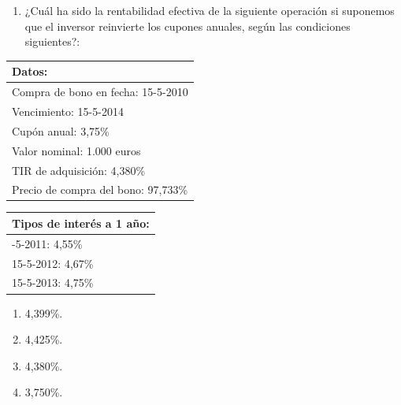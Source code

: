 \documentclass[
  letterpaper,
  DIV=11,
  numbers=noendperiod]{scrreprt}
\providecommand{\tightlist}{%
  \setlength{\itemsep}{0pt}\setlength{\parskip}{0pt}}\usepackage{longtable,booktabs,array}
\begin{document}
\begin{tcolorbox}
\begin{enumerate}
\def\labelenumi{\arabic{enumi}.}
\setcounter{enumi}{9}
\tightlist
\item
  ¿Cuál ha sido la rentabilidad efectiva de la siguiente operación si
  suponemos que el inversor reinvierte los cupones anuales, según las
  condiciones siguientes?:
\end{enumerate}

\begin{longtable}[]{@{}l@{}}
\toprule\noalign{}
\textbf{Datos:} \\
\midrule\noalign{}
\endhead
\bottomrule\noalign{}
\endlastfoot
Compra de bono en fecha: 15-5-2010 \\
Vencimiento: 15-5-2014 \\
Cupón anual: 3,75\% \\
Valor nominal: 1.000 euros \\
TIR de adquisición: 4,380\% \\
Precio de compra del bono: 97,733\% \\
\end{longtable}

\begin{longtable}[]{@{}l@{}}
\toprule\noalign{}
Tipos de interés a 1 año: \\
\midrule\noalign{}
\endhead
\bottomrule\noalign{}
\endlastfoot
15-5-2011: 4,55\% \\
15-5-2012: 4,67\% \\
15-5-2013: 4,75\% \\
\end{longtable}

\begin{enumerate}
\def\labelenumi{\alph{enumi})}
\item
  4,399\%.
\item
  4,425\%.
\item
  4,380\%.
\item
  3,750\%.
\end{enumerate}

\begin{tcolorbox}[enhanced jigsaw, toprule=.15mm, left=2mm, arc=.35mm, breakable, bottomrule=.15mm, opacityback=0, rightrule=.15mm, leftrule=.75mm, colframe=quarto-callout-note-color-frame, colback=white]
\begin{minipage}[t]{5.5mm}
\textcolor{quarto-callout-note-color}{\faInfo}
\end{minipage}%
\begin{minipage}[t]{\textwidth - 5.5mm}


\end{minipage}
\end{tcolorbox}
\end{tcolorbox}
\end{document}
